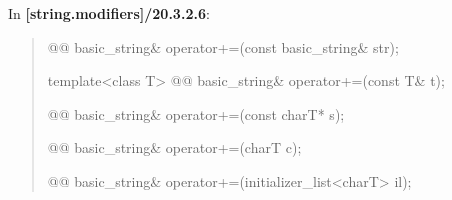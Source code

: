 \documentclass{wg21}
\begin{document}
In \textbf{[string.modifiers]/20.3.2.6}:
\begin{quote}
\begin{itemdecl}
@@ basic_string& operator+=(const basic_string& str);
\end{itemdecl}

\begin{itemdecl}
template<class T>
  @@ basic_string& operator+=(const T& t);
\end{itemdecl}

\begin{itemdecl}
@@ basic_string& operator+=(const charT* s);
\end{itemdecl}

\begin{itemdecl}
@@ basic_string& operator+=(charT c);
\end{itemdecl}

\begin{itemdecl}
@@ basic_string& operator+=(initializer_list<charT> il);
\end{itemdecl}
\end{quote}
\end{document}
